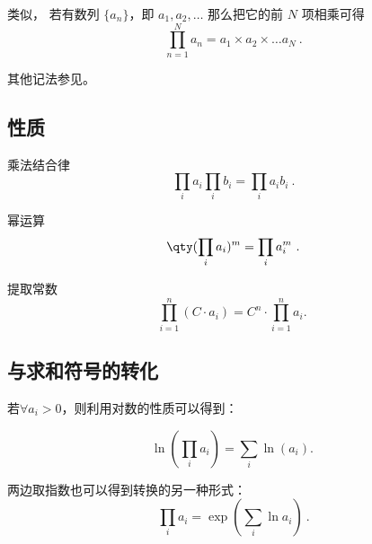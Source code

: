 
\begin{issues}
\issueDraft
\end{issues}

类似， 若有数列 $\{a_n\}$，即 $a_1, a_2, \dots$ 那么把它的前 $N$ 项相乘可得
\begin{equation}
\prod_{n = 1}^N a_n = a_1\times a_2\times \dots a_N~.
\end{equation}

其他记法参见。

\subsection{性质}

乘法结合律
\begin{equation}
\prod_i a_i \prod_i b_i =  \prod_{i} a_i b_i~.
\end{equation}

幂运算
\begin{equation}
\qty(\prod_i a_i)^m =  \prod_i a_i^m~.
\end{equation}

提取常数
\begin{equation}
\prod_{i=1}^n (C \cdot a_i) = C^n \cdot \prod_{i=1}^n a_i.~
\end{equation}

\subsection{与求和符号的转化}

若$\forall a_i > 0$，则利用对数的性质可以得到：

\begin{equation}
\ln \left( \prod_i a_i \right) = \sum_i \ln(a_i).~
\end{equation}

两边取指数也可以得到转换的另一种形式：
\begin{equation}
\prod_i a_i = \exp({\displaystyle\sum_i \ln {a_i}})~.
\end{equation}

